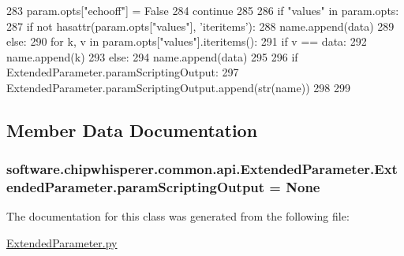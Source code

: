 \begin{DoxyCode}
283                     param.opts[\textcolor{stringliteral}{"echooff"}] = \textcolor{keyword}{False}
284                     \textcolor{keywordflow}{continue}
285 
286             \textcolor{keywordflow}{if} \textcolor{stringliteral}{"values"} \textcolor{keywordflow}{in} param.opts:
287                 \textcolor{keywordflow}{if} \textcolor{keywordflow}{not} hasattr(param.opts[\textcolor{stringliteral}{"values"}], \textcolor{stringliteral}{'iteritems'}):
288                     name.append(data)
289                 \textcolor{keywordflow}{else}:
290                     \textcolor{keywordflow}{for} k, v \textcolor{keywordflow}{in} param.opts[\textcolor{stringliteral}{"values"}].iteritems():
291                         \textcolor{keywordflow}{if} v == data:
292                             name.append(k)
293             \textcolor{keywordflow}{else}:
294                 name.append(data)
295 
296             \textcolor{keywordflow}{if} ExtendedParameter.paramScriptingOutput:
297                 ExtendedParameter.paramScriptingOutput.append(str(name))
298 
299 
\end{DoxyCode}


\subsection{Member Data Documentation}
\hypertarget{classsoftware_1_1chipwhisperer_1_1common_1_1api_1_1ExtendedParameter_1_1ExtendedParameter_a1c38aaa80058ca10945d48cbba61dde9}{}
\subsubsection[{param\+Scripting\+Output}]{\setlength{\rightskip}{0pt plus 5cm}software.\+chipwhisperer.\+common.\+api.\+Extended\+Parameter.\+Extended\+Parameter.\+param\+Scripting\+Output = None\hspace{0.3cm}{\ttfamily [static]}}\label{classsoftware_1_1chipwhisperer_1_1common_1_1api_1_1ExtendedParameter_1_1ExtendedParameter_a1c38aaa80058ca10945d48cbba61dde9}


The documentation for this class was generated from the following file\+:\begin{DoxyCompactItemize}
\item 
\hyperlink{ExtendedParameter_8py}{Extended\+Parameter.\+py}\end{DoxyCompactItemize}
